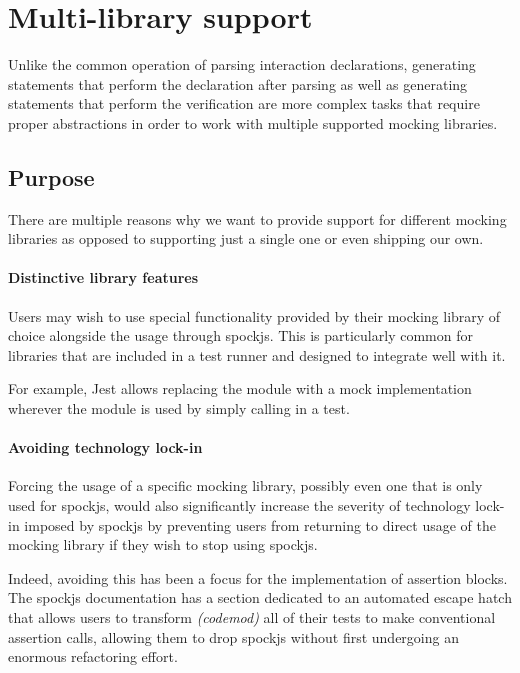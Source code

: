 \section{Multi-library support}
Unlike the common operation of parsing interaction declarations,
generating statements that perform the declaration after parsing
as well as generating statements that perform the verification
are more complex tasks that require proper abstractions in order
to work with multiple supported mocking libraries.

\subsection{Purpose}
There are multiple reasons why we want to provide support
for different mocking libraries as opposed to
supporting just a single one or even shipping our own.

\paragraph{Distinctive library features}
Users may wish to use special functionality
provided by their mocking library of choice
alongside the usage through spockjs.
This is particularly common for libraries
that are included in a test runner and
designed to integrate well with it.

For example, Jest \autocite{JestGithub}
allows replacing the module 
with a mock implementation 
wherever the module is used by simply
calling  in a test.
\autocite{JestMockFunctions}

\paragraph{Avoiding technology lock-in}
Forcing the usage of a specific mocking library,
possibly even one that is only used for spockjs,
would also significantly increase the severity of
technology lock-in imposed by spockjs
by preventing users from returning to
direct usage of the mocking library
if they wish to stop using spockjs.

Indeed, avoiding this has been a focus
for the implementation of assertion blocks.
The spockjs documentation has a section
dedicated to an automated escape hatch
that allows users to transform \textit{(codemod)}
all of their tests to make conventional assertion calls,
allowing them to drop spockjs without first
undergoing an enormous refactoring effort.
\autocite{SpockjsGithub}
